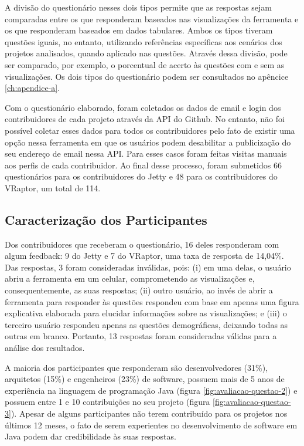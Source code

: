 A divisão do questionário nesses dois tipos permite que as respostas sejam comparadas entre os que responderam baseados nas visualizações da ferramenta e os que responderam baseados em dados tabulares. Ambos os tipos tiveram questões iguais, no entanto, utilizando referências específicas aos cenários dos projetos analisados, quando aplicado nas questões. Através dessa divisão, pode ser comparado, por exemplo, o porcentual de acerto às questões com e sem as visualizações. Os dois tipos do questionário podem ser consultados no apêncice \ref{ch:apendice-a}.

Com o questionário elaborado, foram coletados os dados de email e login dos contribuidores de cada projeto através da API do Github. No entanto, não foi possível coletar esses dados para todos os contribuidores pelo fato de existir uma opção nessa ferramenta em que os usuários podem desabilitar a publicização do seu endereço de email nessa API. Para esses casos foram feitas visitas manuais aos perfis de cada contribuidor. Ao final desse processo, foram submetidos 66 questionários para os contribuidores do Jetty e 48 para os contribuidores do VRaptor, um total de 114.

\subsection{Caracterização dos Participantes} \label{subsec:avaliacao-caracterizacao-participantes}

Dos contribuidores que receberam o questionário, 16 deles responderam com algum feedback: 9 do Jetty e 7 do VRaptor, uma taxa de resposta de 14,04\%. Das respostas, 3 foram consideradas inválidas, pois: (i) em uma delas, o usuário abriu a ferramenta em um celular, comprometendo as visualizações e, consequentemente, as suas respostas; (ii) outro usuário, ao invés de abrir a ferramenta para responder às questões respondeu com base em apenas uma figura explicativa elaborada para elucidar informações sobre as visualizações; e (iii) o terceiro usuário respondeu apenas as questões demográficas, deixando todas as outras em branco. Portanto, 13 respostas foram consideradas válidas para a análise dos resultados.

A maioria dos participantes que responderam são desenvolvedores (31\%), arquitetos (15\%) e engenheiros (23\%) de software, possuem mais de 5 anos de experiência na linguagem de programação Java (figura \ref{fig:avaliacao-questao-2}) e possuem entre 1 e 10 contribuições no seu projeto (figura \ref{fig:avaliacao-questao-3}). Apesar de alguns participantes não terem contribuído para os projetos nos últimos 12 meses, o fato de serem experientes no desenvolvimento de software em Java podem dar credibilidade às suas respostas.

